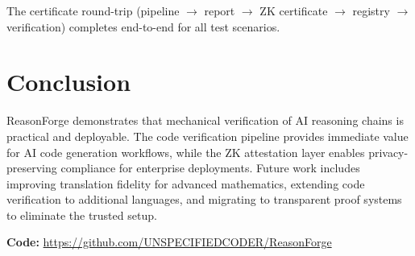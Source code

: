 \documentclass[10pt,a4paper,twocolumn]{article}
\begin{document}
The certificate round-trip (pipeline $\rightarrow$ report $\rightarrow$
ZK certificate $\rightarrow$ registry $\rightarrow$ verification)
completes end-to-end for all test scenarios.

\section{Conclusion}

ReasonForge demonstrates that mechanical verification of AI reasoning
chains is practical and deployable.  The code verification pipeline
provides immediate value for AI code generation workflows, while the ZK
attestation layer enables privacy-preserving compliance for enterprise
deployments.  Future work includes improving translation fidelity for
advanced mathematics, extending code verification to additional
languages, and migrating to transparent proof systems to eliminate the
trusted setup.

\smallskip
\noindent\textbf{Code:}
\url{https://github.com/UNSPECIFIEDCODER/ReasonForge}


\end{document}
